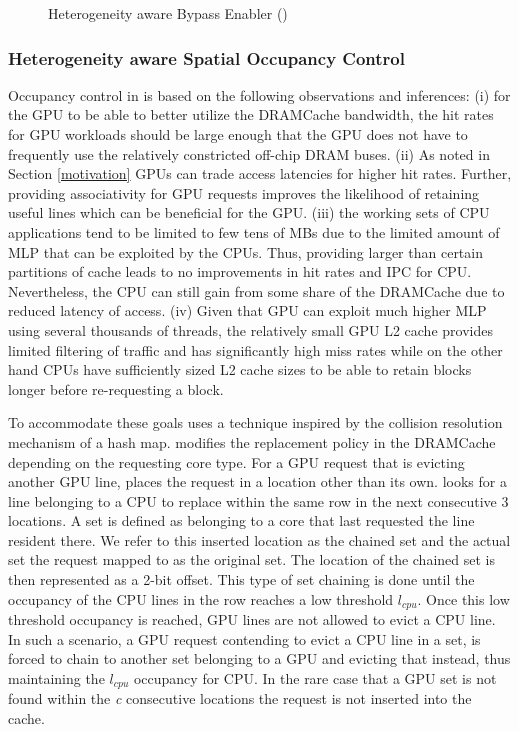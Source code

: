 \begin{figure}[htb]
    \centering
    \bloom
    \caption{Heterogeneity aware Bypass Enabler (\bypassname)}
    \label{fig:chain-access}
\end{figure}

\subsubsection{Heterogeneity aware Spatial Occupancy Control}
Occupancy control in \cachename is based on the following observations and inferences: (i) for the GPU to be able to better utilize the DRAMCache bandwidth, the hit rates for GPU workloads should be large enough that the GPU does not have to frequently use the relatively constricted off-chip DRAM buses. (ii) As noted in Section \ref{motivation} GPUs can trade access latencies for higher hit rates. Further, providing associativity for GPU requests improves the likelihood of retaining useful lines which can be beneficial for the GPU. (iii) the working sets of CPU applications tend to be limited to few tens of MBs due to the limited amount of MLP that can be exploited by the CPUs. Thus, providing larger than certain partitions of cache leads to no improvements in hit rates and IPC for CPU. Nevertheless, the CPU can still gain from some share of the DRAMCache due to reduced latency of access. (iv) Given that GPU can exploit much higher MLP using several thousands of threads, the relatively small GPU L2 cache provides limited filtering of traffic and has significantly high miss rates while on the other hand CPUs have sufficiently sized L2 cache sizes to be able to retain blocks longer before re-requesting a block.
\par To accommodate these goals \cachename uses a technique inspired by the collision resolution mechanism of a hash map. \cachename modifies the replacement policy in the DRAMCache depending on the requesting core type. For a GPU request that is evicting another GPU line, \cachename places the request in a location other than its own. \cachename looks for a line belonging to a CPU to replace within the same row in the next consecutive 3 locations. A set is defined as belonging to a core that last requested the line resident there. We refer to this inserted location as the chained set and the actual set the request mapped to as the original set. The location of the chained set is then represented as a 2-bit offset. This type of set chaining is done until the occupancy of the CPU lines in the row reaches a low threshold \textit{$l_{cpu}$}. Once this low threshold occupancy is reached, GPU lines are not allowed to evict a CPU line. In such a scenario, a GPU request contending to evict a CPU line in a set, is forced to chain to another set belonging to a GPU and evicting that instead, thus maintaining the \textit{$l_{cpu}$} occupancy for CPU. In the rare case that a GPU set is not found within the \textit{c} consecutive locations the request is not inserted into the cache.

